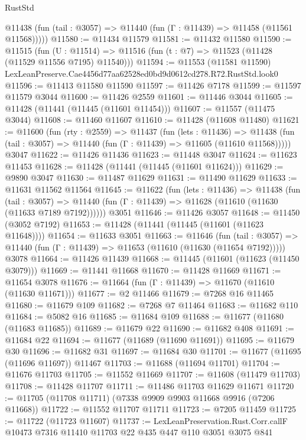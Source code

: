 \begin{lexlean}{RustStd}
\begin{coremodule}
      @11438 (fun (tail : @3057) => @11440 (fun (Γ : @11439) => @11458 (@11561 @11568)))))
@11580 := @11434 @11579
@11581 := @11432 @11580
@11590 := @11515
    (fun (U : @11514) => @11516 (fun (t : @7) => @11523 (@11428 (@11529 @11556 @7195) @11540)))
@11594 := @11553 (@11581 @11590) LexLeanPreserve.Cae4456d77aa62528ed0bd9d0612cd278.R72.RustStd.look0
@11596 := @11413 @11580 @11590
@11597 := @11426 @7178
@11599 := @11597 @11579 @3044
@11600 := @11426 @2559
@11601 := @11446 @3044
@11605 := @11428 (@11441 (@11445 (@11601 @11454)))
@11607 := @11557 (@11475 @3044)
@11608 := @11460 @11607
@11610 := @11428 (@11608 @11480)
@11621 := @11600
    (fun (rty : @2559) =>
    @11437
      (fun (lets : @11436) =>
      @11438 (fun (tail : @3057) => @11440 (fun (Γ : @11439) => @11605 (@11610 @11568)))))
    @3047
@11622 := @11426 @11436
@11623 := @11448 @3047
@11624 := @11623 @11453
@11628 := @11428 (@11441 (@11445 (@11601 @11624)))
@11629 := @9890 @3047
@11630 := @11487 @11629
@11631 := @11490 @11629
@11633 := @11631 @11562 @11564
@11645 := @11622
    (fun (lets : @11436) =>
    @11438
      (fun (tail : @3057) =>
      @11440 (fun (Γ : @11439) => @11628 (@11610 (@11630 (@11633 @7189 @7192))))))
    @3051
@11646 := @11426 @3057
@11648 := @11450 (@3052 @7192)
@11653 := @11428 (@11441 (@11445 (@11601 (@11623 @11648))))
@11654 := @11633 @3051
@11663 := @11646
    (fun (tail : @3057) => @11440 (fun (Γ : @11439) => @11653 (@11610 (@11630 (@11654 @7192)))))
    @3078
@11664 := @11426 @11439
@11668 := @11445 (@11601 (@11623 (@11450 @3079)))
@11669 := @11441 @11668
@11670 := @11428 @11669
@11671 := @11654 @3078
@11676 := @11664 (fun (Γ : @11439) => @11670 (@11610 (@11630 @11671)))
@11677 := @2 @11466
@11679 := @7268 @16 @11465
@11680 := @11679 @109
@11682 := @7268 @7 @11464
@11683 := @11682 @110
@11684 := @5082 @16
@11685 := @11684 @109
@11688 := @11677 (@11680 (@11683 @11685))
@11689 := @11679 @22
@11690 := @11682 @408
@11691 := @11684 @22
@11694 := @11677 (@11689 (@11690 @11691))
@11695 := @11679 @30
@11696 := @11682 @31
@11697 := @11684 @30
@11701 := @11677 (@11695 (@11696 @11697)) @11467
@11703 := @11688 (@11694 @11701)
@11704 := @11676 @11703
@11705 := @11552 @11669
@11707 := @11608 (@11479 @11703)
@11708 := @11428 @11707
@11711 := @11486 @11703 @11629 @11671
@11720 := @11705 (@11708 @11711) (@7338 @9909 @9903 @11668 @9916 (@7206 @11668))
@11722 := @11552 @11707 @11711
@11723 := @7205 @11459
@11725 := @11722 (@11723 @11607)
@11737 := LexLeanPreservation.Rust.Corr.callF
    @10473
    @7316
    @11410
    @11703
    @22
    @435
    @447
    @110
    @3051
    @3075
    @841

\end{coremodule}
\end{lexlean}
